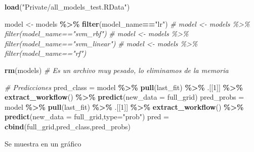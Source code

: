 \documentclass[12pt,a4paper,]{book}
\newenvironment{Shaded}{\begin{snugshade}}{\end{snugshade}}
\newcommand{\AttributeTok}[1]{\textcolor[rgb]{0.13,0.29,0.53}{#1}}
\newcommand{\CommentTok}[1]{\textcolor[rgb]{0.56,0.35,0.01}{\textit{#1}}}
\newcommand{\DecValTok}[1]{\textcolor[rgb]{0.00,0.00,0.81}{#1}}
\newcommand{\FunctionTok}[1]{\textcolor[rgb]{0.13,0.29,0.53}{\textbf{#1}}}
\newcommand{\NormalTok}[1]{#1}
\newcommand{\OtherTok}[1]{\textcolor[rgb]{0.56,0.35,0.01}{#1}}
\newcommand{\SpecialCharTok}[1]{\textcolor[rgb]{0.81,0.36,0.00}{\textbf{#1}}}
\newcommand{\StringTok}[1]{\textcolor[rgb]{0.31,0.60,0.02}{#1}}
\numberwithin{dummy}{section}
\theoremstyle{ocrenumbox}
\theoremstyle{blacknumex}
\theoremstyle{blacknumbox}
\theoremstyle{ocrenum}
\theoremstyle{ocrenum}
\begin{document}
\begin{Shaded}
\begin{Highlighting}[]
\FunctionTok{load}\NormalTok{(}\StringTok{"Private/all\_models\_test.RData"}\NormalTok{)}

\NormalTok{model }\OtherTok{\textless{}{-}}\NormalTok{ models }\SpecialCharTok{\%\textgreater{}\%} \FunctionTok{filter}\NormalTok{(model\_name}\SpecialCharTok{==}\StringTok{"lr"}\NormalTok{)}
\CommentTok{\# model \textless{}{-} models \%\textgreater{}\% filter(model\_name=="svm\_rbf")}
\CommentTok{\# model \textless{}{-} models \%\textgreater{}\% filter(model\_name=="svm\_linear")}
\CommentTok{\# model \textless{}{-} models \%\textgreater{}\% filter(model\_name=="rf")}

\FunctionTok{rm}\NormalTok{(models) }\CommentTok{\# Es un archivo muy pesado, lo eliminamos de la memoria}

\CommentTok{\# Predicciones}
\NormalTok{pred\_class }\OtherTok{=}\NormalTok{ model }\SpecialCharTok{\%\textgreater{}\%} 
  \FunctionTok{pull}\NormalTok{(last\_fit) }\SpecialCharTok{\%\textgreater{}\%} 
\NormalTok{  .[[}\DecValTok{1}\NormalTok{]] }\SpecialCharTok{\%\textgreater{}\%} 
  \FunctionTok{extract\_workflow}\NormalTok{() }\SpecialCharTok{\%\textgreater{}\%} 
  \FunctionTok{predict}\NormalTok{(}\AttributeTok{new\_data =}\NormalTok{ full\_grid)}
\NormalTok{pred\_probs }\OtherTok{=}\NormalTok{ model }\SpecialCharTok{\%\textgreater{}\%} 
  \FunctionTok{pull}\NormalTok{(last\_fit) }\SpecialCharTok{\%\textgreater{}\%} 
\NormalTok{  .[[}\DecValTok{1}\NormalTok{]] }\SpecialCharTok{\%\textgreater{}\%} 
  \FunctionTok{extract\_workflow}\NormalTok{() }\SpecialCharTok{\%\textgreater{}\%} 
  \FunctionTok{predict}\NormalTok{(}\AttributeTok{new\_data =}\NormalTok{ full\_grid,}\AttributeTok{type=}\StringTok{"prob"}\NormalTok{)}
\NormalTok{pred }\OtherTok{=} \FunctionTok{cbind}\NormalTok{(full\_grid,pred\_class,pred\_probs)}
\end{Highlighting}
\end{Shaded}

Se muestra en un gráfico
\end{document}
